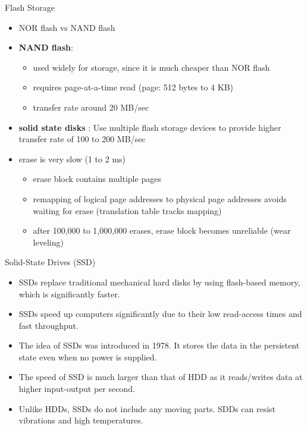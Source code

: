 \documentclass[aspectratio=169, xcolor=dvipsnames]{beamer}
\begin{document}
\begin{frame}{Flash Storage}
    \begin{block}{}
        \begin{itemize}[<+->]
            \item NOR flash vs NAND flash
            \item \textbf{NAND flash}:
            \begin{itemize}[<+->]
                \item used widely for storage, since it is much cheaper than NOR flash
                \item requires page-at-a-time read (page: 512 bytes to 4 KB)
                \item transfer rate around 20 MB/sec
            \end{itemize}
            \item \textbf{solid state disks} : Use multiple flash storage devices to provide higher transfer rate of 100 to 200 MB/sec
            \item erase is very slow (1 to 2 ms)
            \begin{itemize}[<+->]
                \item erase block contains multiple pages
                \item remapping of logical page addresses to physical page addresses avoids waiting for erase (translation table tracks mapping)
                \item after 100,000 to 1,000,000 erases, erase block becomes unreliable (wear leveling)
            \end{itemize}
        \end{itemize}
    \end{block}
\end{frame}

\begin{frame}{Solid-State Drives (SSD)}
    \begin{block}{}
        \begin{itemize}[<+->]
            \item SSDs replace traditional mechanical hard disks by using flash-based memory, which is significantly faster.
            \item SSDs speed up computers significantly due to their low read-access times and fast throughput.
            \item The idea of SSDs was introduced in 1978. It stores the data in the persistent state even when no power is supplied.
            \item The speed of SSD is much larger than that of HDD as it reads/writes data at higher input-output per second.
            \item Unlike HDDs, SSDs do not include any moving parts. SDDs can resist vibrations and high temperatures.
        \end{itemize}
    \end{block}
\end{frame}
\end{document}

